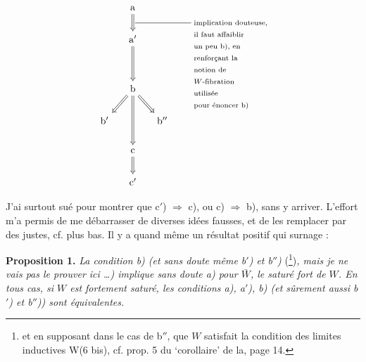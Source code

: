 
\[
\begin{tikzcd}[column sep=small]
& \mathrm{a} \arrow[d,Rightarrow] & \\
& \mathrm{a}' \arrow[dd,Rightarrow,"{\text{\rule[0.6ex]{2cm}{0.4pt}\ \begin{tabular}[t]{@{}l@{}}implication douteuse,\\ il faut affaiblir\\ un peu b), en\\ renforçant la\\ notion de\\ $W$-fibration\\ utilisée\\ pour énoncer b)\end{tabular}}}"] & \\
& & \\
& \mathrm{b} \arrow[dl,Rightarrow] \arrow[dr,Rightarrow] \arrow[dd,Rightarrow] & \\
\mathrm{b}' & & \mathrm{b}'' \\
& \mathrm{c} \arrow[d,Rightarrow] & \\
& \mathrm{c}' &
\end{tikzcd}
\]

J'ai surtout sué pour montrer que c$'$) $\Longrightarrow$ c), ou c) $\Longrightarrow$ b), sans y arriver. L'effort m'a permis de me débarrasser de diverses idées fausses, et de les remplacer par des justes, cf. plus bas. Il y a quand même un résultat positif qui surnage :

\textbf{Proposition 1.} \textit{La condition b) (et sans doute même b$'$) et b$''$)} (\footnote[62]{et en supposant dans le cas de b$''$, que $W$ satisfait la condition des limites inductives W(6 bis), cf. prop. 5 du `corollaire' de la, page 14.})\textit{, mais je ne vais pas le prouver ici \dots) implique sans doute a) pour $\bar{W}$, le saturé fort de $W$. En tous cas, si $W$ est fortement saturé, les conditions a), a$'$), b) (et sûrement aussi b$'$) et b$''$)) sont équivalentes.}


